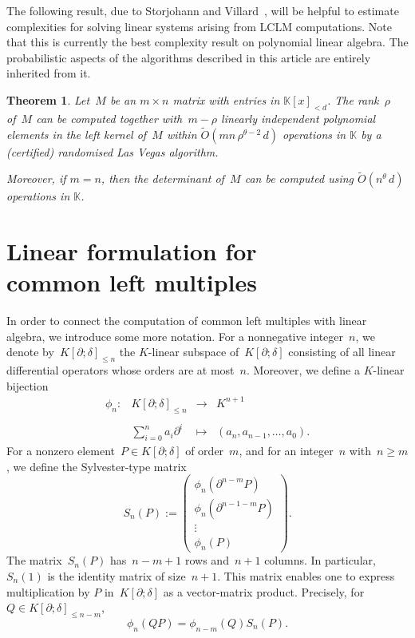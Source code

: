 \documentclass{sig-alt-full}
\def\K {\ensuremath{\mathbb{K}}}
\newcommand{\pa} { \partial}
\newcommand{\bigOsoft}{\widetilde{{O}}}
\newtheorem{theorem}{Theorem}
\begin{document}
The following result, due to Storjohann and
Villard~\cite{Storjohann03,StVi05}, will be helpful to estimate complexities
for solving linear systems arising from LCLM computations. Note that this is
currently the best complexity result on polynomial linear algebra. 
The probabilistic aspects of the algorithms described
in this article are entirely inherited from it. 

\begin{theorem}\emph{\cite{Storjohann03,StVi05}} \label{theo:SV}
Let~$M$ be an $m \times n$
matrix with entries in $\K[x]_{< d}$. 
The rank~$\rho$ of~$M$ can be computed together with~$m-\rho$
linearly independent polynomial elements in the left kernel of~$M$ within
$ \widetilde{O} ( {mn}\,  {\rho^{\theta-2}} \, d )$ operations in $\K$
by a (certified) randomised Las Vegas algorithm.

Moreover, if $m=n$, then the determinant of~$M$ can be computed using $\bigOsoft(n^\theta \, d)$ operations in $\K$.
\end{theorem}


\section{Linear formulation for \\ common left multiples} \label{SECT:mat}

In order to connect the computation of common left multiples with linear algebra, we introduce some more notation.
For a nonnegative integer~$n$, we denote by~$K[\pa;\delta]_{\le n}$ the $K$-linear
subspace of~$K[\pa; \delta]$ consisting of all linear differential operators whose orders are at most~$n$.
Moreover, we define a $K$-linear bijection
$$\begin{array}{cccc}
\phi_n: & K[\pa;\delta]_{\le n} & \longrightarrow & K^{n+1} \\ \\
     & \sum_{i=0}^n a_i \pa^i & \mapsto & (a_n, a_{n-1}, \ldots, a_0).
\end{array}
$$
For a nonzero element~$P \in K[\pa; \delta]$ of order~$m$, and for an integer~$n$ with~$n\ge m$, we define
the Sylvester-type matrix
\[ S_n(P) := \left( \begin{array}{c}
 \phi_n\left(\pa^{n-m} P \right) \\
 \phi_n\left(\pa^{n-1-m} P \right) \\
 \vdots \\
 \phi_n(P)
 \end{array} \right). \]
The matrix~$S_n(P)$
has~$n-m+1$ rows and~$n+1$ columns. In particular,~$S_n(1)$ is the identity
matrix of size~$n+1$. This matrix enables one to express multiplication by $P$ in~$K[\pa; \delta]$ as a vector-matrix product. Precisely, for~$Q \in K[\pa; \delta]_{ \le n-m}$,
\begin{equation} \label{EQ:multiply}
 \phi_n(QP) = \phi_{n-m}(Q) S_n(P).
 \end{equation}
\end{document}
